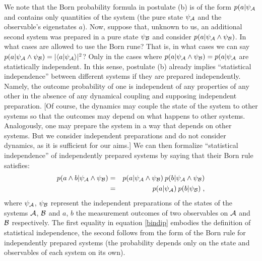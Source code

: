 \documentclass[aps,prl,amsmath,amssymb,twocolumn,nofootinbib]{revtex4}
\theoremstyle{plain}
\theoremstyle{definition}
\theoremstyle{remark}
\def\>{\rangle}
\def\<{\langle}
\def\labell#1{\label{#1}}
\begin{document}
	We note that the Born
	probability formula in postulate (b) is of the form $p(a|\psi_{\cal A}$ and contains only quantities of the
	system (the pure state $\psi_{\cal A}$ and the observable's eigenstates $a$). Now, suppose that, unknown to us, an additional second system was prepared in a pure state $\psi_{\cal B}$ and consider $p(a|\psi_{\cal A}\wedge \psi_{\cal B})$. In what cases are allowed to use the Born rune? That is, in what cases we can say $p(a|\psi_{\cal A}\wedge \psi_{\cal B}) = |\<a|\psi_{\cal A}\>|^2$? Only in the cases where $p(a|\psi_{\cal A}\wedge \psi_{\cal B}) = p(a|\psi_{\cal A}$ are statistically independent. In this sense, postulate (b) already implies  ``statistical independence'' between
	different systems if they are prepared independently. Namely, the
	outcome probability of one is independent of any properties of any
	other in the absence of any dynamical coupling and supposing
	independent preparation. [Of course, the dynamics may couple the state
	of the system to other systems so that the outcomes may depend on what
	happens to other systems.  Analogously, one may prepare the system in
	a way that depends on other systems. But we consider independent
	preparations and do not consider dynamics, as it is sufficient for our
	aims.] We can then formalize ``statistical independence'' of
	independently prepared systems by saying that their Born rule
	satisfies:
	\begin{eqnarray}
	p(a\wedge b|\psi_{\cal A}\wedge \psi_{\cal B})&=&p(a|\psi_{\cal A}\wedge \psi_{\cal
		B})\:p(b|\psi_{\cal A}\wedge \psi_{\cal B})\nonumber\\&=& p(a|\psi_{\cal
		A})\:p(b|\psi_{\cal B})
	\labell{bindip}\;,
	\end{eqnarray}
	where $\psi_{\cal A}$, $\psi_{\cal B}$ represent the independent
	preparations of the states of the systems $\cal A$, $\cal B$ and $a$,
	$b$ the measurement outcomes of two observables on $\cal A$ and $\cal
	B$ respectively. The first equality in equation \eqref{bindip} embodies the
	definition of statistical independence, the second follows from the
	form of the Born rule for independently prepared systems (the
	probability depends only on the state and observables of each system
	on its own).
	
\end{document}

